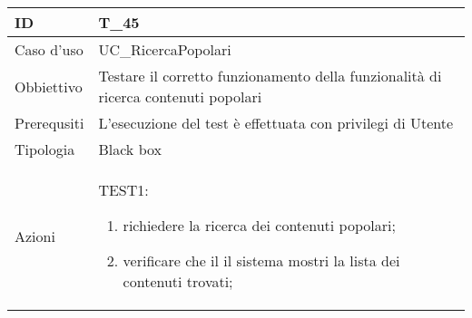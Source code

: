 \begin{table}[hb]
    \centering
    \begin{tabular}{ |p{2cm}|p{10cm}|  }
        \hline
        ID          & T\_45                                                                              \\\hline
        Caso d'uso  & UC\_RicercaPopolari                                                           \\\hline
        Obbiettivo  & Testare il corretto funzionamento della funzionalità di ricerca contenuti popolari \\\hline
        Prerequsiti & L'esecuzione del test è effettuata con privilegi di Utente                         \\\hline
        Tipologia   & Black box                                                                          \\\hline
        Azioni      &
        TEST1:
        \begin{enumerate}[nosep, topsep=0pt]
            \item richiedere la ricerca dei contenuti popolari;
            \item verificare che il il sistema mostri la lista dei contenuti trovati;
        \end{enumerate}
        \\\hline
    \end{tabular}
\end{table}

